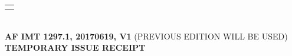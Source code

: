 \documentclass{article}
\begin{document}
{\begin{tabular}{|l|}
\parbox[][\rhV][c]{0.0625\textwidth}{
}\vrule \hspace{1pt}

\parbox[][\rhV][c]{0.0625\textwidth}{
}\\
\hline
\parbox[][\rhV][c]{0.275\textwidth}{
} \vrule\hspace{1pt}

\parbox[][\rhV][c]{0.6\textwidth}{
}\vrule \hspace{1pt}

\parbox[][\rhV][c]{0.0625\textwidth}{
}\vrule \hspace{1pt}

\parbox[][\rhV][c]{0.0625\textwidth}{
}\\
\hline
\parbox[][\rhV][c]{0.275\textwidth}{
} \vrule\hspace{1pt}

\parbox[][\rhV][c]{0.6\textwidth}{
}\vrule \hspace{1pt}

\parbox[][\rhV][c]{0.0625\textwidth}{
}\vrule \hspace{1pt}

\parbox[][\rhV][c]{0.0625\textwidth}{
}\\
\hline
\end{tabular}
}\\[2pt]
\textbf{AF IMT 1297.1, 20170619, V1} \quad (PREVIOUS EDITION WILL BE USED) \quad \textbf{TEMPORARY ISSUE RECEIPT}
\end{document}
